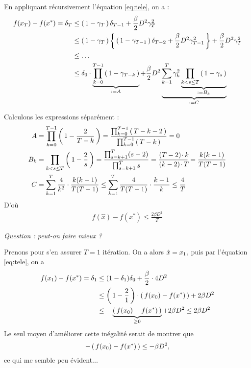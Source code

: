 \begin{rep}

En appliquant récursivement l'équation \eqref{eq:tele}, on a :
\begin{align*}
  f(x_T)-f(x^{*}) = \delta_T &\leq \left( \, 1-\gamma_T \, \right)\delta_{T-1}+ \frac{\beta}{2} D^2 \gamma_T^2\\
&\leq \left( \, 1-\gamma_T \, \right)\left \{ \, \left( \, 1-\gamma_{T-1} \, \right)\delta_{T-2}+ \frac{\beta}{2} D^2 \gamma_{T-1}^2 \, \right \}+ \frac{\beta}{2} D^2 \gamma_T^2\\
&\leq \ldots\\
&\leq \delta_0\cdot  \underbrace{\prod_{k=0}^{T-1} \left( \, 1-\gamma_{T-k} \, \right)}_{:=A}+ \frac{\beta}{2}D^2
\underbrace{\sum_{k=1}^T \gamma_k^2\underbrace{\prod_{k<s\leq T} \left( \, 1-\gamma_s \, \right)}_{:=B_k}}_{:=C}
\end{align*}

Calculons les expressions séparément :
\begin{align*}
  A &= \prod_{k=0}^{T-1} \left( \, 1-\frac{2}{T-k} \, \right)
  = \frac{\prod_{k=0}^{T-1} \left( \, T-k-2 \, \right)}{\prod_{k=0}^{T-1} \left( \, T-k \, \right)}= 0\\
  B_k &= \prod_{k<s\leq T} \left( \, 1-\frac{2}{s} \, \right) = \frac{\prod_{s=k+1}^T(s-2)}{
  \prod_{s=k+1}^T s
  }=\frac{(T-2)\! \cdot k\!}{(k-2)\! \cdot T\!}=\frac{k(k-1)}{T(T-1)}\\
  C &= \sum_{k=1}^T \frac{4}{k^2} \cdot \frac{k(k-1)}{T(T-1)}
  \leq \sum_{k=1}^T \frac{4}{T(T-1)} \cdot \frac{k-1}{k} \leq \frac{4}{T}
\end{align*}
D'où
\begin{align*}
  f ( \hat { x } ) - f \left( x ^ { * } \right) \leq \frac { 2 \beta D ^ { 2 } } { T }
\end{align*}

\textit{Question : peut-on faire mieux ?}

Prenons pour s'en assurer $T=1$ itération. On a alors $\hat{x} = x_1$, puis par l'équation
\eqref{eq:tele}, on a
\begin{align*}
  f(x_1)-f(x^{*}) = \delta_1 &\leq (1-\delta_1)\delta_0 + \frac{\beta}{2}\cdot 4 D^2\\
  &\leq \left( \, 1-\frac{2}{1} \, \right)\cdot \left( \, f(x_0)-f(x^{*}) \, \right) + 2 \beta D^2\\
  &\leq -\underbrace{\left( \, f(x_0)-f(x^{*}) \, \right)}_{\geq 0} + 2 \beta D^2 \leq 2 \beta D^2\\
\end{align*}
Le seul moyen d'améliorer cette inégalité serait de montrer que
\begin{align*}
  -\left( \, f(x_0)-f(x^{*}) \, \right) \leq -\beta D^2,
\end{align*}
ce qui me semble peu évident...
\end{rep}
